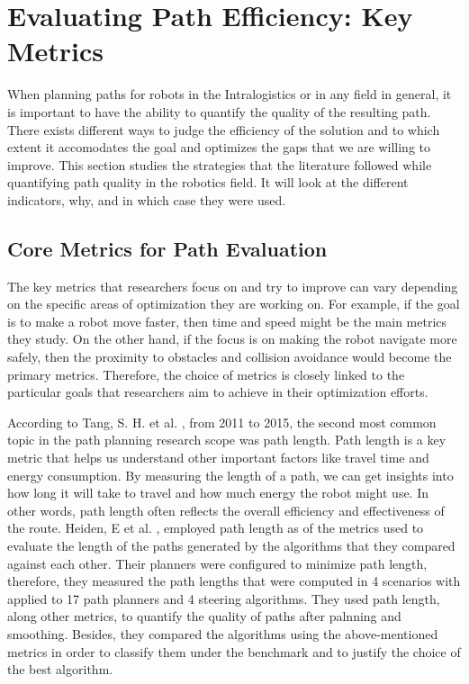 \section{Evaluating Path Efficiency: Key Metrics}

When planning paths for robots in the Intralogistics or in any field in general, it is important to have the ability 
to quantify the quality of the resulting path. There exists different ways to judge the efficiency of the solution
and to which extent it accomodates the goal and optimizes the gaps that we are willing to improve.
This section studies the strategies that the literature followed while quantifying path quality in the robotics
field. It will look at the different indicators, why, and in which case they were used. 

\subsection{Core Metrics for Path Evaluation}
The key metrics that researchers focus on and try to improve can vary depending on the specific areas of 
optimization they are working on. For example, if the goal is to make a robot move faster, then time 
and speed might be the main metrics they study. On the other hand, if the focus is on making the robot 
navigate more safely, then the proximity to obstacles and collision avoidance would become the primary 
metrics. Therefore, the choice of metrics is closely linked to the particular goals that researchers 
aim to achieve in their optimization efforts.

According to Tang, S. H. et al. \cite{R20}, from 2011 to 2015, the second most common topic in the path 
planning research scope was path length. Path length is a key metric that helps us understand other 
important factors like travel time and energy consumption. By measuring the length of a path, we 
can get insights into how long it will take to travel and how much energy the robot might use. 
In other words, path length often reflects the overall efficiency and effectiveness of the route. 
Heiden, E et al. \cite{R23}, employed path length as of the metrics used to evaluate the length of 
the paths generated by the algorithms that they compared against each other. Their planners 
were configured to minimize path length, therefore, they measured the path lengths that were computed 
in 4 scenarios with applied to 17 path planners and 4 steering algorithms. They used path length,
along other metrics, to quantify the quality of paths after palnning and smoothing.
Besides, they compared the algorithms using the above-mentioned metrics in order to classify them
under the benchmark and to justify the choice of the best algorithm.  

